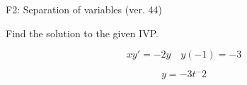 \begin{exercise}
  \begin{exerciseTitle}F2: Separation of variables (ver. 44)\end{exerciseTitle}
  \begin{exerciseStatement}
    
Find the solution to the given IVP.

    
\[xy'= -2 y \hspace{1em} y( -1 ) = -3\]

  \end{exerciseStatement}
  \begin{exerciseAnswer}
    
\[y= -3 t^ -2\]

  \end{exerciseAnswer}
\end{exercise}
